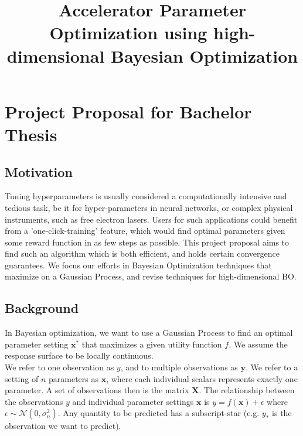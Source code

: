 \documentclass{NSF}
\begin{document}

\pagestyle{headings}

\title{Accelerator Parameter Optimization using high-dimensional Bayesian Optimization}
\section{Project Proposal for Bachelor Thesis}
\subsection{Motivation}

Tuning hyperparameters is usually considered a computationally intensive and tedious task, be it for hyper-parameters in neural networks, or complex physical instruments, such as free electron lasers.
Users for such applications could benefit from a 'one-click-training' feature, which would find optimal parameters given some reward function in as few steps as possible.
This project proposal aims to find such an algorithm which is both efficient, and holds certain convergence guarantees.
We focus our efforts in Bayesian Optimization techniques that maximize on a Gaussian Process, and revise techniques for high-dimensional BO. \\

\subsection{Background}


In Bayesian optimization, we want to use a Gaussian Process to find an optimal parameter setting $\mathbf{x^*}$ that maximizes a given utility function $f$.
We assume the response surface to be locally continuous. \\

We refer to one observation as $y$, and to multiple observations as $\mathbf{y}$.
We refer to a setting of $n$ parameters as $\mathbf{x}$, where each individual scalars represents exactly one parameter.
A set of observations then is the matrix $\mathbf{X}$.
The relationship between the observations $y$ and individual parameter settings $\mathbf{x}$ is $y = f \left( \mathbf{x} \right) + \epsilon$ where $\epsilon \sim  \mathcal{N} \left( 0, \sigma^2_n \right)$. Any quantity to be predicted has a subscript-star (e.g. $y_*$ is the observation we want to predict).\\
\end{document}
